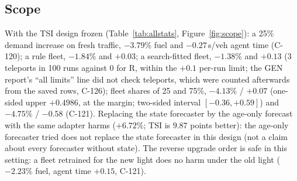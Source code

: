 \documentclass[11pt]{article}
\begin{document}
\subsection{Scope}
With the TSI design frozen (Table~\ref{tab:allstats}, Figure~\ref{fig:scope}): a 25\% demand increase on fresh traffic, $-3.79\%$ fuel and $-0.27$\,s/veh agent
time (C-120); a rule fleet, $-1.84\%$ and $+0.03$; a search-fitted fleet, $-1.38\%$ and $+0.13$ (3 teleports in 100 runs against 0 for R, within the $+0.1$ per-run limit; the GEN report's ``all limits'' line did not check teleports, which were counted afterwards from the saved rows, C-126); fleet shares of 25 and 75\%, $-4.13\%$
/ $+0.07$ (one-sided upper $+0.4986$, at the margin; two-sided interval $[-0.36, +0.59]$) and $-4.75\%$ / $-0.58$ (C-121). Replacing the state forecaster by the age-only forecast with the same
adapter harms ($+6.72\%$; TSI is $9.87$ points better): the age-only forecaster tried does not replace the state forecaster in this
design (not a claim about every forecaster without state). The reverse upgrade order is safe in this
setting: a fleet retrained for the new light does no harm under the old light ($-2.23\%$ fuel, agent time $+0.15$, C-121).
\end{document}
